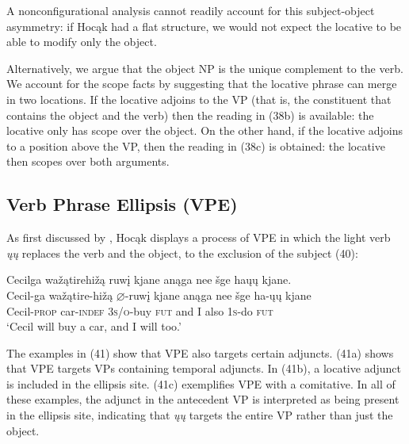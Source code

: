 \documentclass[output=paper]{LSP/langsci}
\begin{document}
A nonconfigurational analysis cannot readily account for this subject-object asymmetry: if Hocąk had a flat structure, we would not expect the locative to be able to modify only the object.
	
Alternatively, we argue that the object NP is the unique complement to the verb. We account for the scope facts by suggesting that the locative phrase can merge in two locations. If the locative adjoins to the VP (that is, the constituent that contains the object and the verb) then the reading in (38b) is available: the locative only has scope over the object. On the other hand, if the locative adjoins to a position above the VP, then the reading in (38c) is obtained: the locative then scopes over both arguments.

\subsection{Verb Phrase Ellipsis (VPE)}

As first discussed by \citet{Johnson2013}, Hocąk displays a process of VPE in which the light verb \textit{\k{u}\k{u}} replaces the verb and the object, to the exclusion of the subject (40):

\begin{exe}
\ex 
\glll Cecilga	wa\v{z}ątirehi\v{z}ą		ruw\k{i}	kjane		anąga	nee		\v{s}ge		ha\k{u}\k{u}			kjane.\\
Cecil-ga	wa\v{z}ątire-hi\v{z}ą	$\varnothing$-ruw\k{i}		kjane		anąga	nee	\v{s}ge ha-\k{u}\k{u}		kjane \\
Cecil-\textsc{prop}		car-\textsc{indef}			\textsc{3s/o}-buy		\textsc{fut}	and	I	also	\textsc{1s}-do	\textsc{fut} \\
\trans `Cecil will buy a car, and I will too.'
\end{exe}

The examples in (41) show that VPE also targets certain adjuncts. (41a) shows that VPE targets VPs containing temporal adjuncts. In (41b), a locative adjunct is included in the ellipsis site. (41c) exemplifies VPE with a comitative. In all of these examples, the adjunct in the antecedent VP is interpreted as being present in the ellipsis site, indicating that \textit{\k{u}\k{u}} targets the entire VP rather than just the object.
\end{document}
